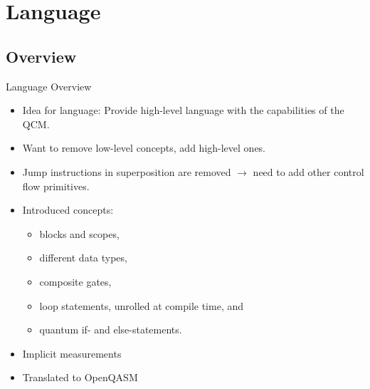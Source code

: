 \section{Language}
\subsection{Overview}
\begin{frame}{Language Overview}
    \begin{itemize}
        \item Idea for language: Provide high-level language with the capabilities of the QCM. 
        \item Want to remove low-level concepts, add high-level ones.
        \item Jump instructions in superposition are removed $\to$ need to add other control flow primitives.
        \item Introduced concepts:
        \begin{itemize}
            \item blocks and scopes,
            \item different data types,
            \item composite gates,
            \item loop statements, unrolled at compile time, and
            \item quantum if- and else-statements.
        \end{itemize}
        \item Implicit measurements
        \item Translated to OpenQASM
    \end{itemize}
\end{frame}

